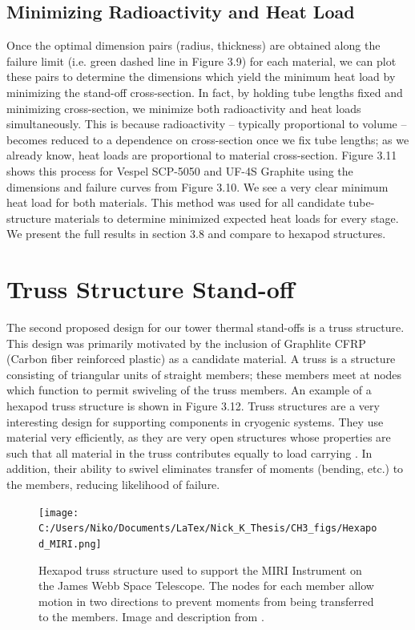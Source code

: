 \documentclass{report}
\begin{document}
\subsection{Minimizing Radioactivity and Heat Load}


Once the optimal dimension pairs (radius, thickness) are obtained along the failure limit (i.e. green dashed line in Figure 3.9) for each material, we can plot these pairs to determine the dimensions which yield the minimum heat load by minimizing the stand-off cross-section. In fact, by holding tube lengths fixed and minimizing cross-section, we minimize both radioactivity and heat loads simultaneously. This is because radioactivity -- typically proportional to volume -- becomes reduced to a dependence on cross-section once we fix tube lengths; as we already know, heat loads are proportional to material cross-section. Figure 3.11 shows this process for Vespel SCP-5050 and UF-4S Graphite using the dimensions and failure curves from Figure 3.10. We see a very clear minimum heat load for both materials. This method was used for all candidate tube-structure materials to determine minimized expected heat loads for every stage. We present the full results in section 3.8 and compare to hexapod structures. 

\section{Truss Structure Stand-off}

The second proposed design for our tower thermal stand-offs is a truss structure. This design was primarily motivated by the inclusion of Graphlite CFRP (Carbon fiber reinforced plastic) as a candidate material. A truss is a structure consisting of triangular units of straight members; these members meet at nodes which function to permit swiveling of the truss members. An example of a hexapod truss structure is shown in Figure 3.12. Truss structures are a very interesting design for supporting components in cryogenic systems. They use material very efficiently, as they are very open structures whose properties are such that all material in the truss contributes equally to load carrying \cite{Hastings1993}. In addition, their ability to swivel eliminates transfer of moments (bending, etc.) to the members, reducing likelihood of failure. 

\begin{figure}[ht]
\centering
\texttt{[image: C:/Users/Niko/Documents/LaTex/Nick\_K\_Thesis/CH3\_figs/Hexapod\_MIRI.png]}
\caption{Hexapod truss structure used to support the MIRI Instrument on the James Webb Space Telescope. The nodes for each member allow motion in two directions to prevent moments from being transferred to the members. Image and description from \cite{Jessen2004}.}
\end{figure}
\end{document}
